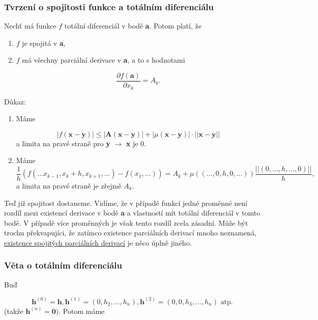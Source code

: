 \documentclass[10pt]{article}
\begin{document}
\subsubsection{Tvrzení o spojitosti funkce a totálním diferenciálu}
\hspace{1.2mm}
Nechť má funkce $f$ totální diferenciál v bodě \textbf{a}. Potom platí, že 
\begin{enumerate}
    \item $f$ je spojitá v \textbf{a},
    \item $f$ má všechny parciální derivace v \textbf{a}, a to s hodnotami 
    
    \[\frac{\partial f(\textbf{a})}{\partial x_k} = A_k.\]
\end{enumerate}
Důkaz:
\begin{enumerate}
    \item Máme
    
    \[|f(\textbf{x}-\textbf{y})| \leq |\textbf{A}(\textbf{x}-\textbf{y})| + |\mu(\textbf{x}-\textbf{y})|\cdot||\textbf{x}-\textbf{y}||\]
    a limita na pravé straně pro \textbf{y} $\rightarrow$ \textbf{x} je 0.
    
    \item Máme 
    \[\frac{1}{h}(f(...x_{k-1},x_k+h,x_{k+1},...) - f(x_1,...)) = A_k + \mu((...,0,h,0,...))\frac{||(0,...,h,...,0)||}{h},\]
    a limita na pravé straně je zřejmě $A_k$.
    
\end{enumerate}
    Teď již spojitost dostaneme. Vidíme, že v případě funkcí jedné proměnné není rozdíl mezi existencí derivace v bodě \textbf{a} a vlastností
    mít totální diferenciál v tomto bodě. V případě více proměnných je však tento rozdíl zcela zásadní. Může být trochu překvapujíci, že 
    zatímco existence parciálních derivací mnoho neznamená, \underline{existence spojitých parciálních derivací} je něco úplně jiného.
\noindent

\subsubsection{Věta o totálním diferenciálu}
\hspace{1.2mm}
Buď

\[\textbf{h}^{(0)} = \textbf{h}, \textbf{h}^{(1)} = (0, h_2,...,h_n), \textbf{h}^{(2)} = (0,0,h_3,...,h_n) \textrm{ atp.} \]
(takže $\textbf{h}^{(n)} = \textbf{0})$. Potom máme
\end{document}
